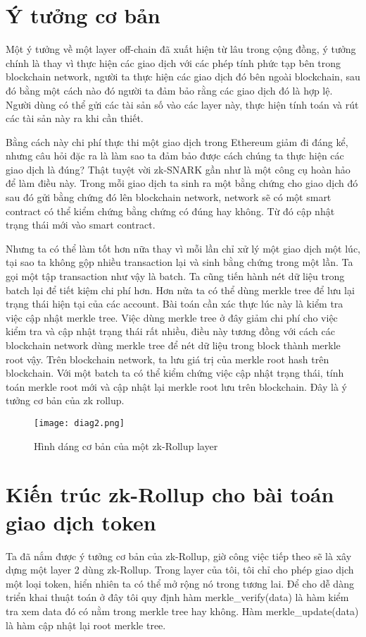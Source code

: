 \documentclass[../thesis.tex]{subfiles}
\begin{document}
\section{Ý tưởng cơ bản}

Một ý tưởng về một layer off-chain đã xuất hiện từ lâu trong cộng đồng, ý tưởng chính là thay vì thực hiện các giao dịch với các phép tính phức tạp bên trong 
blockchain network, người ta thực hiện các giao dịch đó bên ngoài blockchain, sau đó bằng một cách nào đó người ta đảm bảo rằng các giao dịch đó là hợp lệ. Người dùng có thể gửi các tài sản số vào các layer này, thực hiện tính toán và rút các tài sản này ra khi cần thiết.

Bằng cách này chi phí thực thi một giao dịch trong Ethereum giảm đi đáng kể, nhưng câu hỏi đặc ra là làm sao ta đảm bảo được cách chúng ta thực hiện các giao dịch là đúng? Thật tuyệt vời zk-SNARK gần như là một công cụ hoàn hảo để làm điều này. Trong mỗi giao dịch ta sinh ra một bằng chứng cho giao dịch đó sau đó gửi bằng chứng đó lên blockchain network, network sẽ có một smart contract có thể kiểm chứng bằng chứng có đúng hay không. Từ đó cập nhật trạng thái mới vào smart contract. 

Nhưng ta có thể làm tốt hơn nữa thay vì mỗi lần chỉ xử lý một giao dịch một lúc, tại sao ta không gộp nhiều transaction lại và sinh bằng chứng trong một lần. 
Ta gọi một tập transaction như vậy là batch. Ta cũng tiến hành nét dữ liệu trong batch lại để tiết kiệm chi phí hơn. Hơn nửa ta có thể dùng merkle tree để lưu lại trạng thái hiện tại của các account. Bài toán cần xác thực lúc này là kiểm tra việc cập nhật merkle tree. Việc dùng merkle tree ở đây giảm chi phí cho việc kiểm tra và cập nhật trạng thái rất nhiều, điều này tương đồng với cách các blockchain network dùng merkle tree để nét dữ liệu trong block thành merkle root vậy. Trên blockchain network, ta lưu giá trị của merkle root hash trên blockchain. Với một batch ta có thể kiểm chứng việc cập nhật trạng thái, tính toán merkle root mới và cập nhật lại merkle root lưu trên blockchain. Đây là ý tưởng cơ bản của zk rollup. 

\begin{figure}[ht]
   \centering
	\texttt{[image: diag2.png]}
    \caption{Hình dáng cơ bản của một zk-Rollup layer \cite{vitalik}}
    \label{simple-rollup}
\end{figure}

\section{Kiến trúc zk-Rollup cho bài toán giao dịch token}
Ta đã nắm được ý tưởng cơ bản của zk-Rollup, giờ công việc tiếp theo sẽ là xây dựng một layer 2 dùng zk-Rollup. Trong layer của tôi, tôi chỉ cho phép giao dịch một loại token, hiển nhiên ta có thể mở rộng nó trong tương lai. Để cho dễ dàng triển khai thuật toán ở đây tôi quy định hàm merkle\_verify(data) là hàm kiểm tra xem data đó có nằm trong merkle tree hay không. Hàm merkle\_update(data) là hàm cập nhật lại root merkle tree.
\end{document}
